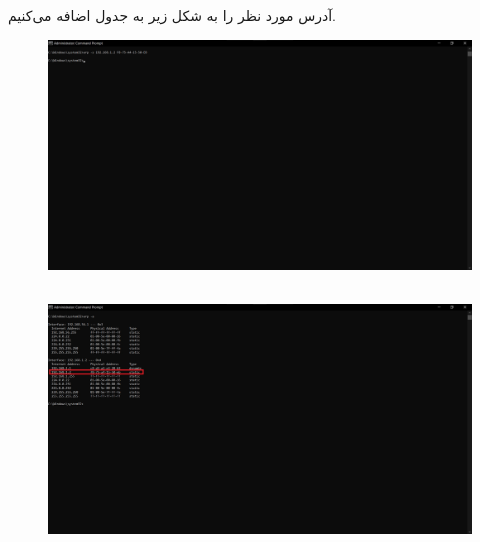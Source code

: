 \documentclass{article}
\begin{document}
\subsection{}
آدرس مورد نظر را به شکل زیر به جدول اضافه می‌کنیم.
\begin{figure}[H]
    \centering
    \includegraphics[width=1.0\textwidth]{figures/7.2.jpg}
    \caption
	{
	}
    \label{fig:fig1}
\end{figure}

\subsection{}
\begin{figure}[H]
    \centering
    \includegraphics[width=1.0\textwidth]{figures/7.3.jpg}
    \caption
	{
	}
    \label{fig:fig1}
\end{figure}
\end{document}
